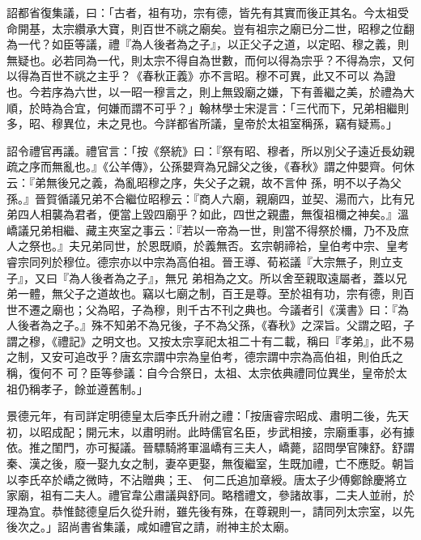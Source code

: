 \begin{pinyinscope}
 詔都省復集議，曰：「古者，祖有功，宗有德，皆先有其實而後正其名。今太祖受命開基，太宗纘承大寶，則百世不祧之廟矣。豈有祖宗之廟已分二世，昭穆之位翻為一代？如臣等議，禮『為人後者為之子』，以正父子之道，以定昭、穆之義，則無疑也。必若同為一代，則太宗不得自為世數，而何以得為宗乎？不得為宗，又何以得為百世不祧之主乎？《春秋正義》亦不言昭。穆不可異，此又不可以
 為證也。今若序為六世，以一昭一穆言之，則上無毀廟之嫌，下有善繼之美，於禮為大順，於時為合宜，何嫌而謂不可乎？」翰林學士宋湜言：「三代而下，兄弟相繼則多，昭、穆異位，未之見也。今詳都省所議，皇帝於太祖室稱孫，竊有疑焉。」



 詔令禮官再議。禮官言：「按《祭統》曰：『祭有昭、穆者，所以別父子遠近長幼親疏之序而無亂也。』《公羊傳》，公孫嬰齊為兄歸父之後，《春秋》謂之仲嬰齊。何休云：『弟無後兄之義，為亂昭穆之序，失父子之親，故不言仲
 孫，明不以子為父孫。』晉賀循議兄弟不合繼位昭穆云：『商人六廟，親廟四，並契、湯而六，比有兄弟四人相襲為君者，便當上毀四廟乎？如此，四世之親盡，無復祖檷之神矣。』溫嶠議兄弟相繼、藏主夾室之事云：『若以一帝為一世，則當不得祭於檷，乃不及庶人之祭也。』夫兄弟同世，於恩既順，於義無否。玄宗朝禘袷，皇伯考中宗、皇考睿宗同列於穆位。德宗亦以中宗為高伯祖。晉王導、荀崧議『大宗無子，則立支子』，又曰『為人後者為之子』，無兄
 弟相為之文。所以舍至親取遠屬者，蓋以兄弟一體，無父子之道故也。竊以七廟之制，百王是尊。至於祖有功，宗有德，則百世不遷之廟也；父為昭，子為穆，則千古不刊之典也。今議者引《漢書》曰：『為人後者為之子。』殊不知弟不為兄後，子不為父孫，《春秋》之深旨。父謂之昭，子謂之穆，《禮記》之明文也。又按太宗享祀太祖二十有二載，稱曰『孝弟』，此不易之制，又安可追改乎？唐玄宗謂中宗為皇伯考，德宗謂中宗為高伯祖，則伯氏之稱，復何不
 可？臣等參議：自今合祭日，太祖、太宗依典禮同位異坐，皇帝於太祖仍稱孝子，餘並遵舊制。」



 景德元年，有司詳定明德皇太后李氏升祔之禮：「按唐睿宗昭成、肅明二後，先天初，以昭成配；開元末，以肅明祔。此時儒官名臣，步武相接，宗廟重事，必有據依。推之閨門，亦可擬議。晉驃騎將軍溫嶠有三夫人，嶠薨，詔問學官陳舒。舒謂秦、漢之後，廢一娶九女之制，妻卒更娶，無復繼室，生既加禮，亡不應貶。朝旨以李氏卒於嶠之微時，不沾贈典；王、
 何二氏追加章綬。唐太子少傅鄭餘慶將立家廟，祖有二夫人。禮官韋公肅議與舒同。略稽禮文，參諸故事，二夫人並祔，於理為宜。恭惟懿德皇后久從升祔，雖先後有殊，在尊親則一，請同列太宗室，以先後次之。」詔尚書省集議，咸如禮官之請，祔神主於太廟。




\end{pinyinscope}
